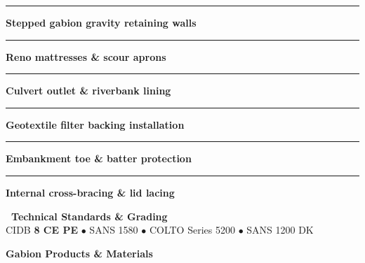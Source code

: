 \documentclass[a4paper,11pt]{article}
\begin{document}
\begin{minipage}[t]{0.34\textwidth}
    \vspace{0pt}
    \begin{tcolorbox}[
        enhanced, colback=mhoffwhite, colframe=mhnavy, boxrule=0.9pt, arc=4pt,
        title={\bfseries\color{white}\faLayerGroup\ Scope of Work},
        colbacktitle=mhnavy, left=7pt, right=7pt, top=5pt, bottom=5pt, drop shadow=black!5
    ]
        \fontsize{7.8pt}{10.8pt}\selectfont
        \textcolor{mhnavy}{\rule{3.5pt}{3.5pt}}\hspace{4pt}\textbf{Stepped gabion gravity retaining walls}\\
        \textcolor{mhnavy}{\rule{3.5pt}{3.5pt}}\hspace{4pt}\textbf{Reno mattresses \& scour aprons}\\
        \textcolor{mhnavy}{\rule{3.5pt}{3.5pt}}\hspace{4pt}\textbf{Culvert outlet \& riverbank lining}\\
        \textcolor{mhnavy}{\rule{3.5pt}{3.5pt}}\hspace{4pt}\textbf{Geotextile filter backing installation}\\
        \textcolor{mhnavy}{\rule{3.5pt}{3.5pt}}\hspace{4pt}\textbf{Embankment toe \& batter protection}\\
        \textcolor{mhnavy}{\rule{3.5pt}{3.5pt}}\hspace{4pt}\textbf{Internal cross-bracing \& lid lacing}
    \end{tcolorbox}

    \vspace{0.12cm}

    \begin{tcolorbox}[
        enhanced, colback=white, colframe=mhlightgray, boxrule=0.8pt, arc=4pt,
        left=6pt, right=6pt, top=5pt, bottom=5pt, drop shadow=black!3
    ]
        {\fontsize{7.5pt}{9.6pt}\selectfont\bfseries\color{mhnavy}\faCheckDouble\ Technical Standards \& Grading}\\[2pt]
        {\fontsize{7.3pt}{9.4pt}\selectfont\color{mhtextmuted}
        CIDB \textbf{8 CE PE} $\bullet$ SANS 1580 $\bullet$ COLTO Series 5200 $\bullet$ SANS 1200 DK}
    \end{tcolorbox}
\end{minipage}

\vfill

\hypertarget{sec:gabionspecs}{}
{\large\bfseries\color{mhnavy} Gabion Products \& Materials}
\vspace{0.08cm}
\end{document}
